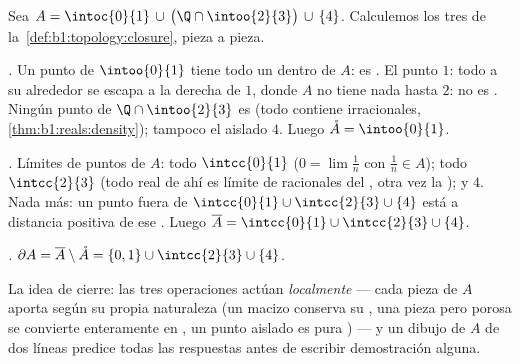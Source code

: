 \begin{example}\label{ex:b1:topology:anatomy}
Sea $A = \intoc{0}{1} \,\cup\, \bigl(\Q \cap \intoo{2}{3}\bigr)
\,\cup\, \{4\}$. Calculemos los tres  de
la~\cref{def:b1:topology:closure}, pieza a pieza.

\emph{.} Un punto de $\intoo{0}{1}$ tiene todo un
 dentro de $A$: es . El punto $1$: todo  a
su alrededor se escapa a la derecha de $1$, donde $A$ no tiene nada
hasta $2$: no es . Ningún punto de $\Q \cap \intoo{2}{3}$ es
 (todo  contiene irracionales,
\cref{thm:b1:reals:density}); tampoco el aislado $4$. Luego
$\mathring A = \intoo{0}{1}$.

\emph{.} Límites de puntos de $A$: todo $\intcc{0}{1}$
($0 = \lim \frac1n$ con $\frac 1n \in A$); todo $\intcc{2}{3}$ (todo
real de ahí es límite de racionales del , otra vez la
); y $4$. Nada más: un punto fuera de
$\intcc{0}{1} \cup \intcc{2}{3} \cup \{4\}$ está a distancia positiva
de ese . Luego $\overline A = \intcc{0}{1} \cup
\intcc{2}{3} \cup \{4\}$.

\emph{.} $\partial A = \overline A \setminus \mathring A
= \{0, 1\} \cup \intcc{2}{3} \cup \{4\}$.

La idea de cierre: las tres operaciones actúan \emph{localmente} ---
cada pieza de $A$ aporta según su propia naturaleza (un 
macizo conserva su , una pieza  pero porosa se convierte
enteramente en , un punto aislado es pura ) --- y un
dibujo de $A$ de dos líneas predice todas las respuestas antes de
escribir demostración alguna.
\end{example}

